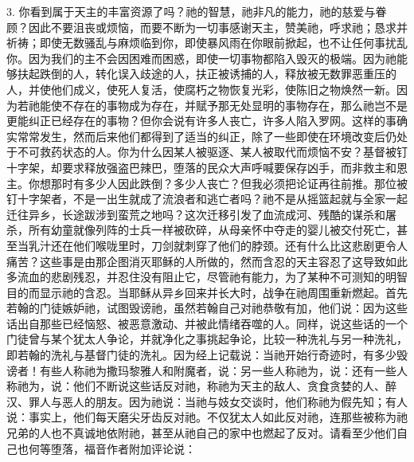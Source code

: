 3. 你看到属于天主的丰富资源了吗？祂的智慧，祂非凡的能力，祂的慈爱与眷顾？因此不要沮丧或烦恼，而要不断为一切事感谢天主，赞美祂，呼求祂；恳求并祈祷；即使无数骚乱与麻烦临到你，即使暴风雨在你眼前掀起，也不让任何事扰乱你。因为我们的主不会因困难而困惑，即使一切事物都陷入毁灭的极端。因为祂能够扶起跌倒的人，转化误入歧途的人，扶正被诱捕的人，释放被无数罪恶重压的人，并使他们成义，使死人复活，使腐朽之物恢复光彩，使陈旧之物焕然一新。因为若祂能使不存在的事物成为存在，并赋予那无处显明的事物存在，那么祂岂不是更能纠正已经存在的事物？但你会说有许多人丧亡，许多人陷入罗网。这样的事确实常常发生，然而后来他们都得到了适当的纠正，除了一些即使在环境改变后仍处于不可救药状态的人。你为什么因某人被驱逐、某人被取代而烦恼不安？基督被钉十字架，却要求释放强盗巴辣巴，堕落的民众大声呼喊要保存凶手，而非救主和恩主。你想那时有多少人因此跌倒？多少人丧亡？但我必须把论证再往前推。那位被钉十字架者，不是一出生就成了流浪者和逃亡者吗？祂不是从摇篮起就与全家一起迁往异乡，长途跋涉到蛮荒之地吗？这次迁移引发了血流成河、残酷的谋杀和屠杀，所有幼童就像列阵的士兵一样被砍碎，从母亲怀中夺走的婴儿被交付死亡，甚至当乳汁还在他们喉咙里时，刀剑就刺穿了他们的脖颈。还有什么比这悲剧更令人痛苦？这些事是由那企图消灭耶稣的人所做的，然而含忍的天主容忍了这导致如此多流血的悲剧残忍，并忍住没有阻止它，尽管祂有能力，为了某种不可测知的明智目的而显示祂的含忍。当耶稣从异乡回来并长大时，战争在祂周围重新燃起。首先若翰的门徒嫉妒祂，试图毁谤祂，虽然若翰自己对祂恭敬有加，他们说：因为这些话出自那些已经恼怒、被恶意激动、并被此情绪吞噬的人。同样，说这些话的一个门徒曾与某个犹太人争论，并就净化之事挑起争论，比较一种洗礼与另一种洗礼，即若翰的洗礼与基督门徒的洗礼。因为经上记载说：当祂开始行奇迹时，有多少毁谤者！有些人称祂为撒玛黎雅人和附魔者，说：另一些人称祂为，说：还有一些人称祂为，说：他们不断说这些话反对祂，称祂为天主的敌人、贪食贪婪的人、醉汉、罪人与恶人的朋友。因为祂说：当祂与妓女交谈时，他们称祂为假先知；有人说：事实上，他们每天磨尖牙齿反对祂。不仅犹太人如此反对祂，连那些被称为祂兄弟的人也不真诚地依附祂，甚至从祂自己的家中也燃起了反对。请看至少他们自己也何等堕落，福音作者附加评论说：\par

